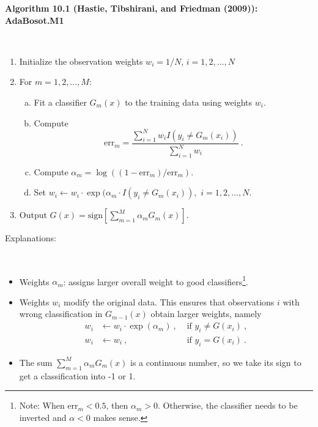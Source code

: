 \documentclass[
  10pt,
  ignorenonframetext,
]{beamer}
\providecommand{\tightlist}{%
  \setlength{\itemsep}{0pt}\setlength{\parskip}{0pt}}
\begin{document}
\begin{frame}
\textbf{Algorithm 10.1 (Hastie, Tibshirani, and Friedman (2009)):
AdaBosot.M1}

\(~\)

\begin{enumerate}
\tightlist
\item
  Initialize the observation weights \(w_i= 1/N\), \(i=1,2,\ldots, N\)
\end{enumerate}

\vspace{2mm}

\begin{enumerate}
\setcounter{enumi}{1}
\tightlist
\item
  For \(m=1,2,...,M\):

  \begin{enumerate}
  [a)]
  \tightlist
  \item
    Fit a classifier \(G_m(x)\) to the training data using weights
    \(w_i\).
  \item
    Compute
    \[\text{err}_m = \frac{\sum_{i=1}^N w_i I(y_i\neq G_m(x_i))}{\sum_{i=1}^N w_i} \ .\]
  \item
    Compute \(\alpha_m = \log((1-\text{err}_m)/\text{err}_m)\).
  \item
    Set
    \(w_i \leftarrow w_i \cdot \exp(\alpha_m \cdot I(y_i\neq G_m(x_i)),\)
    \(i=1,2,\ldots, N\).
  \end{enumerate}
\end{enumerate}

\vspace{2mm}

\begin{enumerate}
\setcounter{enumi}{2}
\tightlist
\item
  Output
  \(G(x) = \text{sign}\left[\sum_{m=1}^M \alpha_m G_m(x)\right]\).
\end{enumerate}
\end{frame}

\begin{frame}
Explanations:

\(~\)

\begin{itemize}
\item
  Weights \(\alpha_m\): assigns larger overall weight to good
  classifiers\footnote{Note: When $\text{err}_m<0.5$, then $\alpha_m>0$. Otherwise, the classifier needs to be inverted and $\alpha<0$ makes sense.}.
\item
  Weights \(w_i\) modify the original data. This ensures that
  observations \(i\) with wrong classification in \(G_{m-1}(x)\) obtain
  larger weights, namely \begin{align*} 
   w_i &\leftarrow w_i \cdot \exp(\alpha_m) \ , &\text{ if } y_i \neq G(x_i) \ , \\
   w_i &\leftarrow w_i \ , &\text{ if } y_i = G(x_i) \ .
   \end{align*}
\item
  The sum \(\sum_{m=1}^M \alpha_m G_m(x)\) is a continuous number, so we
  take its sign to get a classification into -1 or 1.
\end{itemize}
\end{frame}
\end{document}
